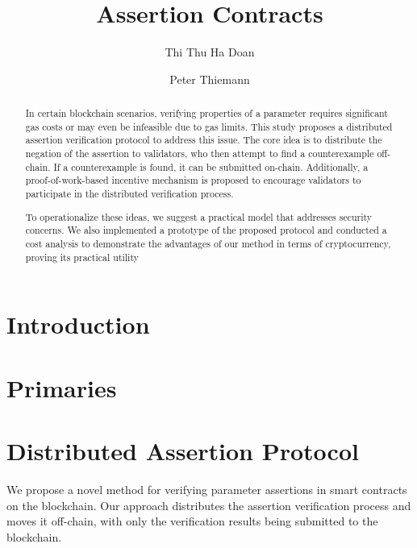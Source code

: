 \documentclass[runningheads]{llncs}
\begin{document}
%
\title{Assertion Contracts}
%
%
\author{Thi Thu Ha Doan\and Peter Thiemann}

%
%
%
\maketitle              %
%
\begin{abstract}
In certain blockchain scenarios, verifying properties of a parameter requires significant gas costs or may even be infeasible due to gas limits. This study proposes a distributed assertion verification protocol to address this issue. The core idea is to distribute the negation of the assertion to validators, who then attempt to find a counterexample off-chain. If a counterexample is found, it can be submitted on-chain. Additionally, a proof-of-work-based incentive mechanism is proposed to encourage validators to participate in the distributed verification process.

To operationalize these ideas, we suggest a practical model that addresses security concerns. We also implemented a prototype of the proposed protocol and conducted a cost analysis to demonstrate the advantages of our method in terms of cryptocurrency, proving its practical utility
 \keywords{}
\end{abstract}
%
%
%
\section{Introduction}
\label{sec:introduction}
\section{Primaries}
\label{sec:primaries}


\section{Distributed Assertion Protocol}
\label{sec:approach}
We propose a novel method for verifying parameter assertions in smart contracts on the blockchain. Our approach distributes the assertion verification process and moves it off-chain, with only the verification results being submitted to the blockchain.
\end{document}
